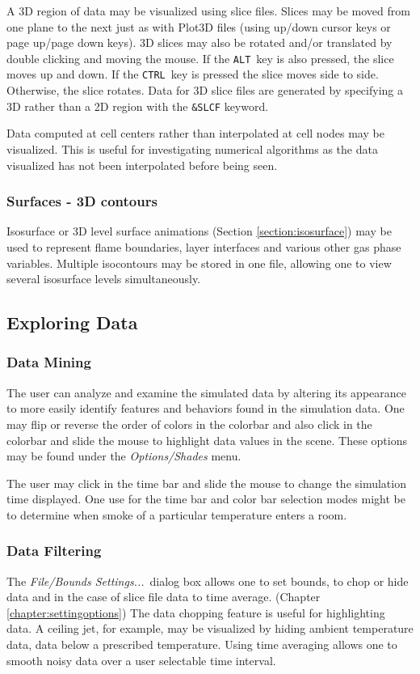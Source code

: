 \documentclass[11pt,twoside]{book}
\begin{document}
A 3D region of
data may be visualized using slice files.  Slices may be moved from one plane to
the next just as with Plot3D files (using up/down cursor keys or
page up/page down keys).
3D slices may also be rotated and/or translated by double clicking and moving the mouse. If the {\tt ALT}\ key
is also pressed, the slice moves up and down.  If the {\tt CTRL}\ key is pressed the slice moves side to side.
Otherwise, the slice rotates.
Data for 3D slice files are generated by specifying a 3D rather than a 2D region with the {\tt \&SLCF} keyword.

Data computed at cell centers rather than interpolated at cell nodes may be visualized.
This is useful for investigating numerical algorithms as the data visualized has not been interpolated before being seen.

\subsubsection{Surfaces - 3D contours}
Isosurface or 3D level surface animations (Section
\ref{section:isosurface}) may be used to represent flame
boundaries, layer interfaces and various other gas phase
variables. Multiple isocontours may be stored in one file,
allowing one to view several isosurface levels simultaneously.


\subsection{Exploring Data}

\subsubsection{Data Mining} The user can analyze and examine the simulated
data by altering its appearance to more easily identify features
and behaviors found in the simulation data. One may flip or
reverse the order of colors in the colorbar and also click in the
colorbar and slide the mouse to highlight data values in the
scene. These options may be found under the {\em Options/Shades}
menu.

The user may click in the time bar and slide the mouse to
change the simulation time displayed. One use for the time
bar and color bar selection modes might be to determine
when smoke of a particular temperature enters a room.

\subsubsection{Data Filtering} The {\em File/Bounds Settings...}\
dialog box allows one to set bounds, to chop or hide data and in the case
of slice file data to time average. (Chapter \ref{chapter:settingoptions})
The data chopping
feature is useful for highlighting data.  A ceiling jet, for example,
may be visualized by hiding ambient temperature
data,  data below a prescribed temperature.
Using time averaging allows one to smooth noisy data over a user selectable time
interval.
\end{document}
